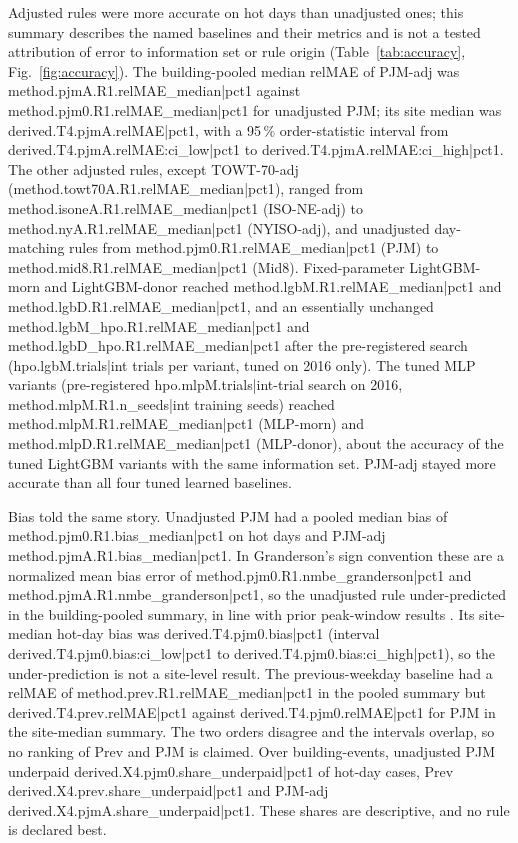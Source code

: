 Adjusted rules were more accurate on hot days than unadjusted ones; this summary describes the named baselines and their metrics and is not a tested attribution of error to information set or rule origin (Table~\ref{tab:accuracy}, Fig.~\ref{fig:accuracy}). The building-pooled median relMAE of PJM-adj was {{method.pjmA.R1.relMAE_median|pct1}} against {{method.pjm0.R1.relMAE_median|pct1}} for unadjusted PJM; its site median was {{derived.T4.pjmA.relMAE|pct1}}, with a 95\,\% order-statistic interval from {{derived.T4.pjmA.relMAE:ci_low|pct1}} to {{derived.T4.pjmA.relMAE:ci_high|pct1}}. The other adjusted rules, except TOWT-70-adj ({{method.towt70A.R1.relMAE_median|pct1}}), ranged from {{method.isoneA.R1.relMAE_median|pct1}} (ISO-NE-adj) to {{method.nyA.R1.relMAE_median|pct1}} (NYISO-adj), and unadjusted day-matching rules from {{method.pjm0.R1.relMAE_median|pct1}} (PJM) to {{method.mid8.R1.relMAE_median|pct1}} (Mid8). Fixed-parameter LightGBM-morn and LightGBM-donor reached {{method.lgbM.R1.relMAE_median|pct1}} and {{method.lgbD.R1.relMAE_median|pct1}}, and an essentially unchanged {{method.lgbM_hpo.R1.relMAE_median|pct1}} and {{method.lgbD_hpo.R1.relMAE_median|pct1}} after the pre-registered search ({{hpo.lgbM.trials|int}} trials per variant, tuned on 2016 only). The tuned MLP variants (pre-registered {{hpo.mlpM.trials|int}}-trial search on 2016, {{method.mlpM.R1.n_seeds|int}} training seeds) reached {{method.mlpM.R1.relMAE_median|pct1}} (MLP-morn) and {{method.mlpD.R1.relMAE_median|pct1}} (MLP-donor), about the accuracy of the tuned LightGBM variants with the same information set. PJM-adj stayed more accurate than all four tuned learned baselines.

Bias told the same story. Unadjusted PJM had a pooled median bias of {{method.pjm0.R1.bias_median|pct1}} on hot days and PJM-adj {{method.pjmA.R1.bias_median|pct1}}. In Granderson's sign convention these are a normalized mean bias error of {{method.pjm0.R1.nmbe_granderson|pct1}} and {{method.pjmA.R1.nmbe_granderson|pct1}}, so the unadjusted rule under-predicted in the building-pooled summary, in line with prior peak-window results \cite{granderson2021}. Its site-median hot-day bias was {{derived.T4.pjm0.bias|pct1}} (interval {{derived.T4.pjm0.bias:ci_low|pct1}} to {{derived.T4.pjm0.bias:ci_high|pct1}}), so the under-prediction is not a site-level result. The previous-weekday baseline had a relMAE of {{method.prev.R1.relMAE_median|pct1}} in the pooled summary but {{derived.T4.prev.relMAE|pct1}} against {{derived.T4.pjm0.relMAE|pct1}} for PJM in the site-median summary. The two orders disagree and the intervals overlap, so no ranking of Prev and PJM is claimed. Over building-events, unadjusted PJM underpaid {{derived.X4.pjm0.share_underpaid|pct1}} of hot-day cases, Prev {{derived.X4.prev.share_underpaid|pct1}} and PJM-adj {{derived.X4.pjmA.share_underpaid|pct1}}. These shares are descriptive, and no rule is declared best.

